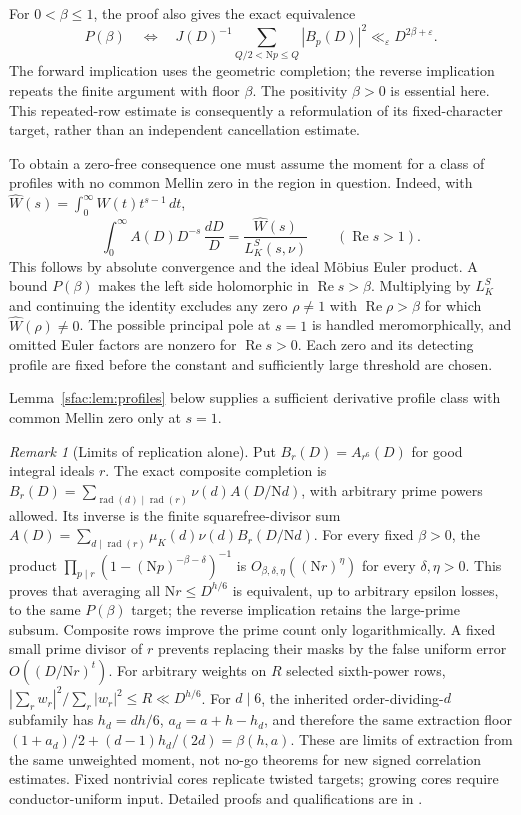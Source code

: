 \documentclass[11pt]{article}
\numberwithin{equation}{section}
\theoremstyle{definition}
\theoremstyle{remark}
\newtheorem{remark}[theorem]{Remark}
\newcommand{\N}{\mathrm N}
\newcommand{\muK}{\mu_K}
\newcommand{\rad}{\operatorname{rad}}
\newcommand{\eps}{\varepsilon}
\newcommand{\Rea}{\operatorname{Re}}
\begin{document}
For $0<\beta\le1$, the proof also gives the exact equivalence
\begin{equation}\label{eq:prime-row-equivalence}
 P(\beta)\quad\Longleftrightarrow\quad
 J(D)^{-1}\sum_{Q/2<\N p\le Q}|B_p(D)|^2
 \ll_\eps D^{2\beta+\eps}.
\end{equation}
The forward implication uses the geometric completion; the reverse
implication repeats the finite argument with floor $\beta$.
The positivity $\beta>0$ is essential here. This repeated-row estimate
is consequently a reformulation of its fixed-character target, rather
than an independent cancellation estimate.

To obtain a zero-free consequence one must assume the moment for a
class of profiles with no common Mellin zero in the region in question.
Indeed, with $\widehat W(s)=\int_0^\infty W(t)t^{s-1}\,dt$,
\begin{equation}\label{eq:extraction-mellin}
 \int_0^\infty A(D)D^{-s}\,\frac{dD}{D}
 =\frac{\widehat W(s)}{L_K^S(s,\nu)}\qquad(\Rea s>1).
\end{equation}
This follows by absolute convergence and the ideal M\"obius Euler
product. A bound $P(\beta)$ makes the left side holomorphic in
$\Rea s>\beta$. Multiplying by $L_K^S$ and continuing the identity
excludes any zero $\rho\ne1$ with $\Rea\rho>\beta$ for which
$\widehat W(\rho)\ne0$. The possible principal pole at $s=1$ is
handled meromorphically, and omitted Euler factors are nonzero for
$\Rea s>0$. Each zero and its detecting profile are fixed before the
constant and sufficiently large threshold are chosen.

Lemma~\ref{sfac:lem:profiles} below supplies a sufficient derivative
profile class with common Mellin zero only at \(s=1\).

\begin{remark}[Limits of replication alone]
Put $B_r(D)=A_{r^6}(D)$ for good integral ideals $r$.
The exact composite completion is
$B_r(D)=\sum_{\rad(d)\mid\rad(r)}\nu(d)A(D/\N d)$,
with arbitrary prime powers allowed. Its inverse is the finite
squarefree-divisor sum
$A(D)=\sum_{d\mid\rad(r)}\muK(d)\nu(d)B_r(D/\N d)$.
For every fixed $\beta>0$, the product
$\prod_{p\mid r}(1-(\N p)^{-\beta-\delta})^{-1}$ is
$O_{\beta,\delta,\eta}((\N r)^\eta)$ for every $\delta,\eta>0$.
This proves that averaging all $\N r\le D^{h/6}$ is equivalent, up to
arbitrary epsilon losses, to the same $P(\beta)$ target; the reverse
implication retains the large-prime subsum. Composite rows improve the
prime count only logarithmically. A fixed small prime divisor of $r$
prevents replacing their masks by the false uniform error
$O((D/\N r)^t)$.
For arbitrary weights on $R$ selected sixth-power rows,
$|\sum_r w_r|^2/\sum_r|w_r|^2\le R\ll D^{h/6}$.
For $d\mid6$, the inherited order-dividing-$d$ subfamily has
$h_d=dh/6$, $a_d=a+h-h_d$, and therefore the same extraction floor
$(1+a_d)/2+(d-1)h_d/(2d)=\beta(h,a)$.
These are limits of extraction from the same unweighted moment, not
no-go theorems for new signed correlation estimates. Fixed nontrivial
cores replicate twisted targets; growing cores require conductor-uniform
input. Detailed proofs and qualifications are in \cite{N5,N6}.
\end{remark}
\end{document}
